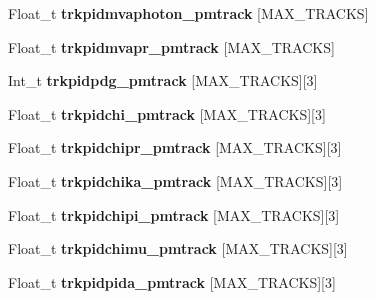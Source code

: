 \begin{DoxyCompactItemize}
\item 
\hypertarget{classanatree_a974e98b742c376ccfe2a3e0bd20947ba}{Float\-\_\-t {\bfseries trkpidmvaphoton\-\_\-pmtrack} \mbox{[}M\-A\-X\-\_\-\-T\-R\-A\-C\-K\-S\mbox{]}}\label{classanatree_a974e98b742c376ccfe2a3e0bd20947ba}

\item 
\hypertarget{classanatree_a1067b651892b2a233dda3af95404c38d}{Float\-\_\-t {\bfseries trkpidmvapr\-\_\-pmtrack} \mbox{[}M\-A\-X\-\_\-\-T\-R\-A\-C\-K\-S\mbox{]}}\label{classanatree_a1067b651892b2a233dda3af95404c38d}

\item 
\hypertarget{classanatree_a152ff0b86ebe43db932477e6e8c5c97e}{Int\-\_\-t {\bfseries trkpidpdg\-\_\-pmtrack} \mbox{[}M\-A\-X\-\_\-\-T\-R\-A\-C\-K\-S\mbox{]}\mbox{[}3\mbox{]}}\label{classanatree_a152ff0b86ebe43db932477e6e8c5c97e}

\item 
\hypertarget{classanatree_a04f235e7f567a56b9e4f57e29951f56d}{Float\-\_\-t {\bfseries trkpidchi\-\_\-pmtrack} \mbox{[}M\-A\-X\-\_\-\-T\-R\-A\-C\-K\-S\mbox{]}\mbox{[}3\mbox{]}}\label{classanatree_a04f235e7f567a56b9e4f57e29951f56d}

\item 
\hypertarget{classanatree_a10afd72e171cb2acdf32f559430cce71}{Float\-\_\-t {\bfseries trkpidchipr\-\_\-pmtrack} \mbox{[}M\-A\-X\-\_\-\-T\-R\-A\-C\-K\-S\mbox{]}\mbox{[}3\mbox{]}}\label{classanatree_a10afd72e171cb2acdf32f559430cce71}

\item 
\hypertarget{classanatree_a7dd6069054219c524b779192e4bfe467}{Float\-\_\-t {\bfseries trkpidchika\-\_\-pmtrack} \mbox{[}M\-A\-X\-\_\-\-T\-R\-A\-C\-K\-S\mbox{]}\mbox{[}3\mbox{]}}\label{classanatree_a7dd6069054219c524b779192e4bfe467}

\item 
\hypertarget{classanatree_a4836875292cc6bd88013cbfad956e7cf}{Float\-\_\-t {\bfseries trkpidchipi\-\_\-pmtrack} \mbox{[}M\-A\-X\-\_\-\-T\-R\-A\-C\-K\-S\mbox{]}\mbox{[}3\mbox{]}}\label{classanatree_a4836875292cc6bd88013cbfad956e7cf}

\item 
\hypertarget{classanatree_a1877c5a4dfb4328d9be64fdca42c0839}{Float\-\_\-t {\bfseries trkpidchimu\-\_\-pmtrack} \mbox{[}M\-A\-X\-\_\-\-T\-R\-A\-C\-K\-S\mbox{]}\mbox{[}3\mbox{]}}\label{classanatree_a1877c5a4dfb4328d9be64fdca42c0839}

\item 
\hypertarget{classanatree_a15e4e0281b72834a80bee0bd4b62b6bf}{Float\-\_\-t {\bfseries trkpidpida\-\_\-pmtrack} \mbox{[}M\-A\-X\-\_\-\-T\-R\-A\-C\-K\-S\mbox{]}\mbox{[}3\mbox{]}}\label{classanatree_a15e4e0281b72834a80bee0bd4b62b6bf}


\end{DoxyCompactItemize}
